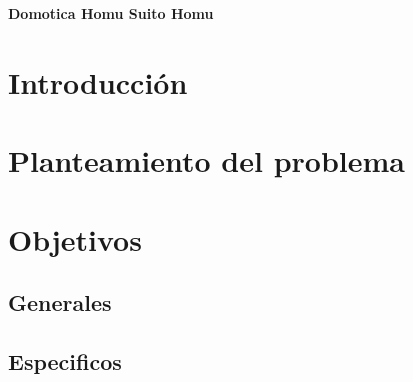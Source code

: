 \documentclass[12pt,letterpaper]{article}
\author{Juan Edison Giraldo}
\begin{document}
\textbf{Domotica Homu Suito Homu}
\section{Introducción}

\section{Planteamiento del problema}

\section{Objetivos}
\subsection{Generales}

\subsection{Especificos}
\end{document}
